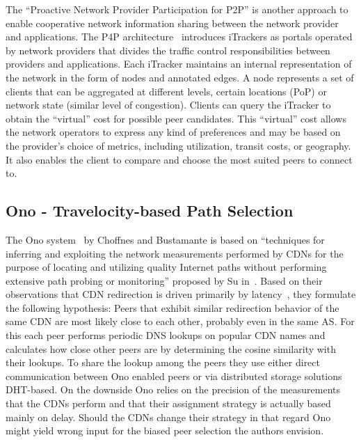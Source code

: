 The ``Proactive Network Provider Participation for P2P'' is another approach to
enable cooperative network information sharing between the network provider and
applications. The P4P architecture~\cite{p4p} introduces iTrackers as portals
operated by network providers that divides the traffic control responsibilities
between providers and applications. Each iTracker maintains an internal
representation of the network in the form of nodes and annotated edges.  A node
represents a set of clients that can be aggregated at different levels, \eg
certain locations (PoP) or network state (similar level of congestion).
Clients can query the iTracker to obtain the ``virtual'' cost for possible peer
candidates. This ``virtual'' cost allows the network operators to express any
kind of preferences and may be based on the provider's choice of metrics,
including utilization, transit costs, or geography. It also enables the client
to compare and choose the most suited peers to connect to.


\subsection{Ono - Travelocity-based Path Selection}\label{sec:Ono}

The Ono system~\cite{taming} by Choffnes and Bustamante is based on
``techniques for inferring and exploiting the network measurements performed by
CDNs for the purpose of locating and utilizing quality Internet paths without
performing extensive path probing or monitoring'' proposed by Su \etal
in~\cite{DraftingAkamai:SIGCOMM2006}. Based on their observations that CDN
redirection is driven primarily by latency~\cite{DraftingAkamai:SIGCOMM2006},
they formulate the following hypothesis: Peers that exhibit similar redirection
behavior of the same CDN are most likely close to each other, probably even in
the same AS.  For this each peer performs periodic DNS lookups on popular CDN
names and calculates how close other peers are by determining the cosine
similarity with their lookups. To share the lookup among the peers they use
either direct communication between Ono enabled peers or via distributed
storage solutions \eg DHT-based.  On the downside Ono relies on the precision
of the measurements that the CDNs perform and that their assignment strategy is
actually based mainly on delay. Should the CDNs change their strategy in that
regard Ono might yield wrong input for the biased peer selection the authors
envision.

